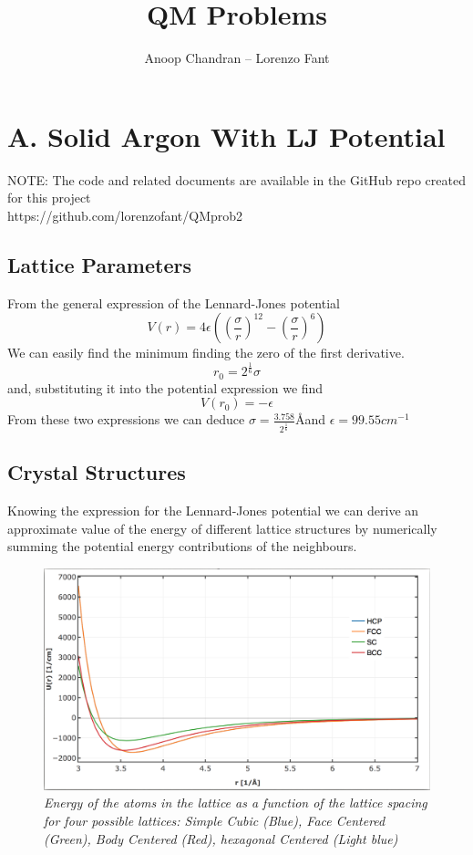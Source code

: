 \documentclass[a4paper]{article}
\title{QM Problems}
\author{Anoop Chandran -- Lorenzo Fant}
\begin{document}
\maketitle
\section{A. Solid Argon With LJ Potential}
NOTE: The code and related documents are available in the GitHub repo created for this project \\
https://github.com/lorenzofant/QMprob2
\subsection{Lattice Parameters}
From the general expression of the Lennard-Jones potential
\begin{equation}
V(r) = 4\epsilon\left(\left(\frac{\sigma}{r}\right)^12-\left(\frac{\sigma}{r}\right)^6\right)
\end{equation}
We can easily find the minimum finding the zero of the first derivative.
\begin{equation}
r_0 = 2^{\frac{1}{6}}\sigma
\end{equation}
and, substituting it into the potential expression we find
\begin{equation}
V(r_0) = -\epsilon
\end{equation}
From these two expressions we can deduce $\sigma = \frac{3.758}{2^{\frac{1}{6}}}$\AA and $\epsilon = 99.55 cm^{-1}$
\subsection{Crystal Structures}
Knowing the expression for the Lennard-Jones potential we can derive an approximate value of the energy of different lattice structures by numerically summing the potential energy contributions of the neighbours.
\begin{figure}[h]
    \centering
    \includegraphics[width=12cm]{lj.png}
    \caption{\it \label{en(spacing)}Energy of the atoms in the lattice as a function of the lattice spacing for four possible lattices: Simple Cubic (Blue), Face Centered (Green), Body Centered (Red), hexagonal Centered (Light blue)}
\end{figure}
    
\end{document}
